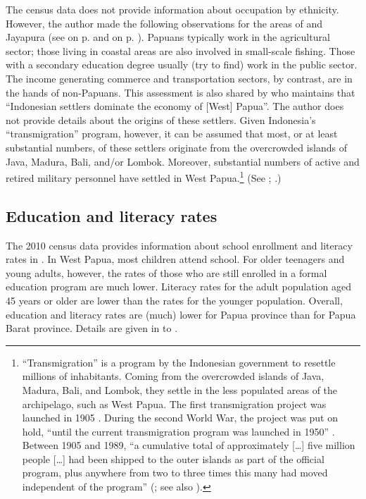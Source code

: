 {The census data does not provide information about occupation by ethnicity. However, the author made the following observations for the areas of  and Jayapura (see  on p. \pageref{Figure_0.2} and  on p. \pageref{Figure_0.3}). Papuans typically work in the agricultural sector; those living in coastal areas are also involved in small-scale fishing. Those with a secondary education degree usually (try to find) work in the public sector. The income generating commerce and transportation sectors, by contrast, are in the hands of non-Papuans. This assessment is also shared by {\citet[124]{Chauvel.2002}} who maintains that  ``Indonesian settlers dominate the economy of [West] Papua''. The author does not provide details about the origins of these settlers. Given Indonesia’s ``transmigration'' program, however, it can be assumed that most, or at least substantial numbers, of these settlers originate from the overcrowded islands of Java, Madura, Bali, and/or Lombok. Moreover, substantial numbers of active and retired military personnel have settled in West Papua.\footnote{\label{Footnote_1.43} ``Transmigration'' is a program by the Indonesian government to resettle millions of inhabitants. Coming from the overcrowded islands of Java, Madura, Bali, and Lombok, they settle in the less populated areas of the archipelago, such as West Papua. The first transmigration project was launched in 1905 {\citep[553]{Fearnside.1997}}. During the second World War, the project was put on hold,  ``until the current transmigration program was launched in 1950'' \citep[554]{Fearnside.1997}. Between 1905 and 1989,  ``a cumulative total of approximately [\ldots] five million people [\ldots] had been shipped to the outer islands as part of the official program, plus anywhere from two to three times this many had moved independent of the program'' (\citealt[554]{Fearnside.1997}; see also \citealt{EmbassyoftheRepublicofIndonesiainLondon.2009}).} (See \citealt{Fearnside.1997}; \citealt{EmbassyoftheRepublicofIndonesiainLondon.2009}.)


\subsection{Education and literacy rates}\label{Para_1.7.3}
The 2010 census data provides information about school enrollment and literacy rates in . In West Papua, most children attend school. For older teenagers and young adults, however, the rates of those who are still enrolled in a formal education program are much lower. Literacy rates for the adult population aged 45 years or older are lower than the rates for the younger population. Overall, education and literacy rates are (much) lower for Papua province than for Papua Barat province. Details are given in  to .



}
